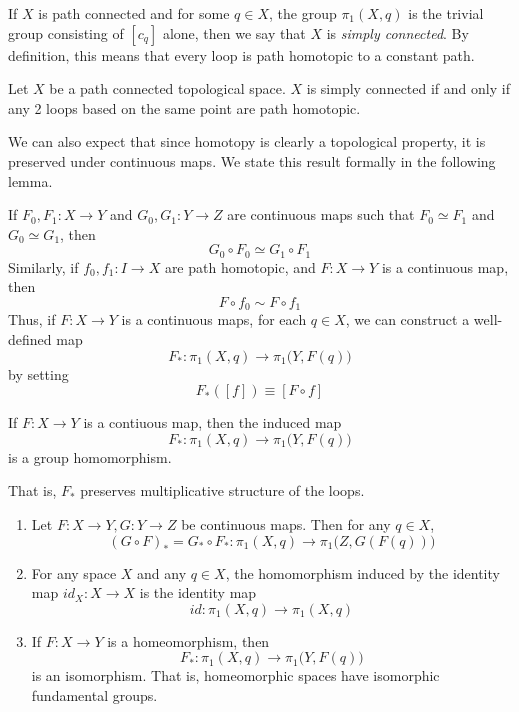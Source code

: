   \begin{definition}
  If $X$ is path connected and for some $q \in X$, the group $\pi_1 (X, q)$ is the trivial group consisting of $[c_q]$ alone, then we say that $X$ is \textit{simply connected}. By definition, this means that every loop is path homotopic to a constant path. 
  \end{definition}

  \begin{proposition}
  Let $X$ be a path connected topological space. $X$ is simply connected if and only if any 2 loops based on the same point are path homotopic. 
  \end{proposition}

  We can also expect that since homotopy is clearly a topological property, it is preserved under continuous maps. We state this result formally in the following lemma.

  \begin{lemma}
  If $F_0, F_1: X \longrightarrow Y$ and $G_0, G_1: Y \longrightarrow Z$ are continuous maps such that $F_0 \simeq F_1$ and $G_0 \simeq G_1$, then 
  \[G_0 \circ F_0 \simeq G_1 \circ F_1\]
  Similarly, if $f_0, f_1: I \longrightarrow X$ are path homotopic, and $F: X \longrightarrow Y$ is a continuous map, then 
  \[F \circ f_0 \sim F \circ f_1\]
  Thus, if $F: X \longrightarrow Y$ is a continuous maps, for each $q \in X$, we can construct a well-defined map
  \[F_*: \pi_1 (X, q) \longrightarrow \pi_1 \big( Y, F(q)\big)\]
  by setting
  \[F_* ([f]) \equiv [F \circ f]\]
  \end{lemma}

  \begin{lemma}
  If $F: X \longrightarrow Y$ is a contiuous map, then the induced map 
  \[F_* : \pi_1(X, q) \longrightarrow \pi_1 \big( Y, F(q)\big)\]
  is a group homomorphism. 
  That is, $F_*$ preserves multiplicative structure of the loops. 
  \end{lemma}

  \begin{theorem}
  \begin{enumerate}
      \item Let $F: X \longrightarrow Y, G: Y \longrightarrow Z$ be continuous maps. Then for any $q \in X$, 
      \[(G \circ F)_* = G_* \circ F_* : \pi_1 (X, q) \longrightarrow \pi_1 \big(Z, G(F(q))\big)\]
      \item For any space $X$ and any $q \in X$, the homomorphism induced by the identity map $id_X: X \longrightarrow X$ is the identity map 
      \[id: \pi_1 (X, q) \longrightarrow \pi_1 (X, q)\]
      \item If $F: X \longrightarrow Y$ is a homeomorphism, then 
      \[F_* : \pi_1 (X, q) \longrightarrow \pi_1\big( Y, F(q)\big)\]
      is an isomorphism. That is, homeomorphic spaces have isomorphic fundamental groups.  
  \end{enumerate}
  \end{theorem}

